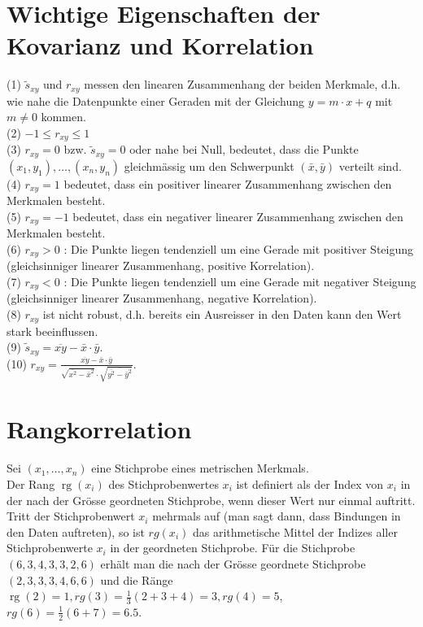 \documentclass[10pt]{article}
\begin{document}
\section*{Wichtige Eigenschaften der Kovarianz und Korrelation}
(1) $\tilde{s}_{x y}$ und $r_{x y}$ messen den linearen Zusammenhang der beiden Merkmale, d.h. wie nahe die Datenpunkte einer Geraden mit der Gleichung $y=m \cdot x+q$ mit $m \neq 0$ kommen.\\
(2) $-1 \leq r_{x y} \leq 1$\\
(3) $r_{x y}=0$ bzw. $\tilde{s}_{x y}=0$ oder nahe bei Null, bedeutet, dass die Punkte $\left(x_{1}, y_{1}\right), \ldots,\left(x_{n}, y_{n}\right)$ gleichmässig um den Schwerpunkt $(\bar{x}, \bar{y})$ verteilt sind.\\
(4) $r_{x y}=1$ bedeutet, dass ein positiver linearer Zusammenhang zwischen den Merkmalen besteht.\\
(5) $r_{x y}=-1$ bedeutet, dass ein negativer linearer Zusammenhang zwischen den Merkmalen besteht.\\
(6) $r_{x y}>0$ : Die Punkte liegen tendenziell um eine Gerade mit positiver Steigung (gleichsinniger linearer Zusammenhang, positive Korrelation).\\
(7) $r_{x y}<0$ : Die Punkte liegen tendenziell um eine Gerade mit negativer Steigung (gleichsinniger linearer Zusammenhang, negative Korrelation).\\
(8) $r_{x y}$ ist nicht robust, d.h. bereits ein Ausreisser in den Daten kann den Wert stark beeinflussen.\\
(9) $\tilde{s}_{x y}=\overline{x y}-\bar{x} \cdot \bar{y}$.\\
(10) $r_{x y}=\frac{\overline{x y}-\bar{x} \cdot \bar{y}}{\sqrt{\overline{x^{2}}-\bar{x}^{2}} \cdot \sqrt{\overline{\overline{y^{2}}-\bar{y}^{2}}}}$.

\section*{Rangkorrelation}
Sei $\left(x_{1}, \ldots, x_{n}\right)$ eine Stichprobe eines metrischen Merkmals.\\
Der Rang $\operatorname{rg}\left(x_{i}\right)$ des Stichprobenwertes $x_{i}$ ist definiert als der Index von $x_{i}$ in der nach der Grösse geordneten Stichprobe, wenn dieser Wert nur einmal auftritt. Tritt der Stichprobenwert $x_{i}$ mehrmals auf (man sagt dann, dass Bindungen in den Daten auftreten), so ist $r g\left(x_{i}\right)$ das arithmetische Mittel der Indizes aller Stichprobenwerte $x_{i}$ in der geordneten Stichprobe. Für die Stichprobe $(6,3,4,3,3,2,6)$ erhält man die nach der Grösse geordnete Stichprobe $(2,3,3,3,4,6,6)$ und die Ränge $\operatorname{rg}(2)=1, r g(3)=\frac{1}{3}(2+3+4)=3, r g(4)=5$, $r g(6)=\frac{1}{2}(6+7)=6.5$.
\end{document}
